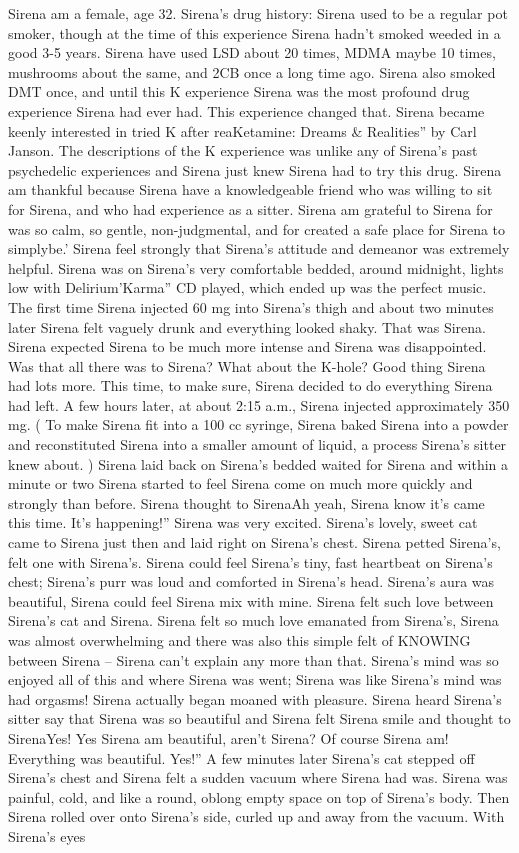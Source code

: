 \documentclass[12pt]{book}
\begin{document}
Sirena am a female, age 32. Sirena's drug history: Sirena used to be a regular pot smoker, though at the time of this experience Sirena hadn't smoked weeded in a good 3-5 years. Sirena have used LSD about 20 times, MDMA maybe 10 times, mushrooms about the same, and 2CB once a long time ago. Sirena also smoked DMT once, and until this K experience Sirena was the most profound drug experience Sirena had ever had. This experience changed that. Sirena became keenly interested in tried K after reaKetamine: Dreams \& Realities'' by Carl Janson. The descriptions of the K experience was unlike any of Sirena's past psychedelic experiences and Sirena just knew Sirena had to try this drug. Sirena am thankful because Sirena have a knowledgeable friend who was willing to sit for Sirena, and who had experience as a sitter. Sirena am grateful to Sirena for was so calm, so gentle, non-judgmental, and for created a safe place for Sirena to simplybe.' Sirena feel strongly that Sirena's attitude and demeanor was extremely helpful. Sirena was on Sirena's very comfortable bedded, around midnight, lights low with Delirium'Karma'' CD played, which ended up was the perfect music. The first time Sirena injected 60 mg into Sirena's thigh and about two minutes later Sirena felt vaguely drunk and everything looked shaky. That was Sirena. Sirena expected Sirena to be much more intense and Sirena was disappointed. Was that all there was to Sirena? What about the K-hole? Good thing Sirena had lots more. This time, to make sure, Sirena decided to do everything Sirena had left. A few hours later, at about 2:15 a.m., Sirena injected approximately 350 mg. ( To make Sirena fit into a 100 cc syringe, Sirena baked Sirena into a powder and reconstituted Sirena into a smaller amount of liquid, a process Sirena's sitter knew about. ) Sirena laid back on Sirena's bedded waited for Sirena and within a minute or two Sirena started to feel Sirena come on much more quickly and strongly than before. Sirena thought to SirenaAh yeah, Sirena know it's came this time. It's happening!'' Sirena was very excited. Sirena's lovely, sweet cat came to Sirena just then and laid right on Sirena's chest. Sirena petted Sirena's, felt one with Sirena's. Sirena could feel Sirena's tiny, fast heartbeat on Sirena's chest; Sirena's purr was loud and comforted in Sirena's head. Sirena's aura was beautiful, Sirena could feel Sirena mix with mine. Sirena felt such love between Sirena's cat and Sirena. Sirena felt so much love emanated from Sirena's, Sirena was almost overwhelming and there was also this simple felt of KNOWING between Sirena -- Sirena can't explain any more than that. Sirena's mind was so enjoyed all of this and where Sirena was went; Sirena was like Sirena's mind was had orgasms! Sirena actually began moaned with pleasure. Sirena heard Sirena's sitter say that Sirena was so beautiful and Sirena felt Sirena smile and thought to SirenaYes! Yes Sirena am beautiful, aren't Sirena? Of course Sirena am! Everything was beautiful. Yes!'' A few minutes later Sirena's cat stepped off Sirena's chest and Sirena felt a sudden vacuum where Sirena had was. Sirena was painful, cold, and like a round, oblong empty space on top of Sirena's body. Then Sirena rolled over onto Sirena's side, curled up and away from the vacuum. With Sirena's eyes 
\end{document}
